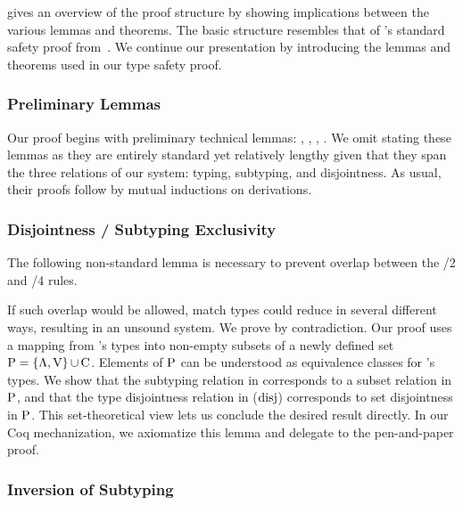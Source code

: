 
 gives an overview of the proof structure by showing implications between the various lemmas and theorems.
The basic structure resembles that of \SystemFsub's standard safety proof from~\citep{pierce2002types}.
We continue our presentation by introducing the lemmas and theorems used in our type safety proof.

\subsubsection*{Preliminary Lemmas}
Our proof begins with preliminary technical lemmas: , , , .
We omit stating these lemmas as they are entirely standard yet relatively lengthy given that they span the three relations of our system: typing, subtyping, and disjointness.
As usual, their proofs follow by mutual inductions on derivations.

\subsubsection*{Disjointness / Subtyping Exclusivity}
The following non-standard lemma is necessary to prevent overlap between the /2 and /4 rules.
%

%
If such overlap would be allowed, match types could reduce in several different ways, resulting in an unsound system.
We prove  by contradiction.
Our proof uses a mapping from \SystemFm's types into non-empty subsets of a newly defined set $\P \= \{ \Λ, \V \} \∪ \C$.
Elements of $\P$ can be understood as equivalence classes for \Fm's types.
We show that the subtyping relation in \Fm corresponds to a subset relation in $\P$, and that the type disjointness relation in \Fm ($\disj$) corresponds to set disjointness in $\P$.
This set-theoretical view lets us conclude the desired result directly.
In our Coq mechanization, we axiomatize this lemma and delegate to the pen-and-paper proof.

\subsubsection*{Inversion of Subtyping}

